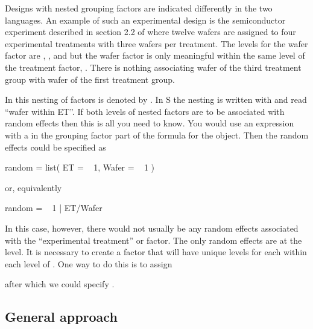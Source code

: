 \documentclass[12pt]{article}
\newcommand{\s}{\textsf{S}}
\begin{document}
Designs with nested grouping factors are indicated differently in the
two languages.  An example of such an experimental design is the
semiconductor experiment described in section 2.2 of
\citet{litt:mill:stro:wolf:1996} where twelve wafers are 
assigned to four experimental treatments with three wafers per
treatment.  The levels for the wafer factor are , , and
 but the wafer factor is only meaningful within the same level
of the treatment factor, .  There is nothing associating wafer
 of the third treatment group with wafer  of the first
treatment group.

In  this nesting of factors is denoted by .  In
\s{} the nesting is written with  and read ``wafer
within ET''.  If both levels of nested factors are to be associated
with random effects then this is all you need to know.  You would use
an expression with a  in the grouping factor part of the
formula for the  object.  Then the random effects
could be specified as
\begin{Example}
  random = list( ET = ~ 1, Wafer = ~ 1 )
\end{Example}
or, equivalently
\begin{Example}
  random = ~ 1 | ET/Wafer
\end{Example}

In this case, however, there would not usually be any random effects
associated with the ``experimental treatment'' or  factor.  The 
only random effects are at the  level.  It is necessary to
create a factor that will have unique levels for each 
within each level of .  One way to do this is to assign
\begin{Schunk}
\end{Schunk}
after which we could specify .

\subsection{General approach}
\label{sec:generalApproach}
\end{document}
